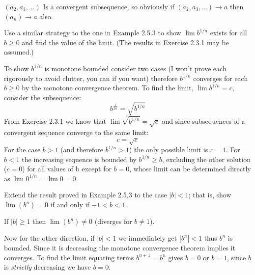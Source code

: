 \begin{solution}
  $(a_2, a_3, \dots)$ Is a convergent subsequence, so obviously if $(a_2, a_3, \dots) \to a$ then $(a_n) \to a$ also.
\end{solution}

\begin{exercise}
  Use a similar strategy to the one in Example 2.5.3 to show $\lim b^{1 / n}$ exists for all $b \geq 0$ and find the value of the limit. (The results in Exercise 2.3.1 may be assumed.)
\end{exercise}

\begin{solution}
  To show $b^{1/n}$ is monotone bounded consider two cases (I won't prove each rigorously to avoid clutter, you can if you want)
  therefore $b^{1/n}$ converges for each $b \ge 0$ by the monotone convergence theorem. To find the limit, $\lim b^{1/n}=c$, consider the subsequence:
  $$
  b^{\frac{1}{2n}} = \sqrt{b^{1/n}}
  $$
  From Exercise 2.3.1 we know that $\lim\sqrt{b^{1/n}}=\sqrt{c}$ and since subsequences of a convergent sequence converge to the same limit:
  $$
  c=\sqrt{c}
  $$
  For the case $b > 1$ (and therefore $b^{1/n}>1$) the only possible limit is $c=1$. For $b<1$ the increasing sequence is bounded by $b^{1/n}\ge b$, excluding the other solution ($c=0$) for all values of b except for $b=0$, whose limit can be determined directly as $\lim 0^{1/n}=\lim 0=0$.
\end{solution}

\begin{exercise}
  Extend the result proved in Example 2.5.3 to the case $|b|<1$; that is, show $\lim \left(b^{n}\right)=0$ if and only if $-1<b<1$.
\end{exercise}

\begin{solution}
  If $|b| \ge 1$ then $\lim (b^n) \ne 0$ (diverges for $b \ne 1$).

  Now for the other direction, if $|b| < 1$ we immediately get $|b^n| < 1$ thus $b^n$ is bounded.
  Since it is decreasing the monotone convergence theorem implies it converges.
  To find the limit equating terms $b^{n+1} = b^{n}$ gives $b = 0$ or $b = 1$, since $b$ is \emph{strictly} decreasing we have $b = 0$.
\end{solution}

